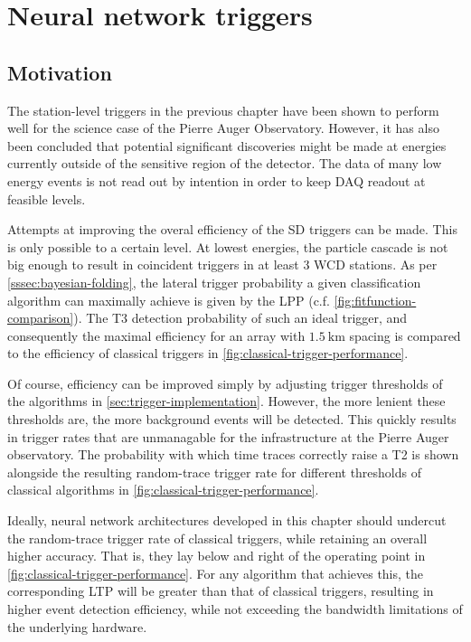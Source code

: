 
\chapter{Neural network triggers}
\label{chap:neural-network-triggers}

\section{Motivation}
\label{sec:motivation}

The station-level triggers in the previous chapter have been shown to perform well for the science case of the Pierre Auger Observatory. However, it has also been
concluded that potential significant discoveries might be made at energies currently outside of the sensitive region of the detector. The data of many low energy 
events is not read out by intention in order to keep DAQ readout at feasible levels.

Attempts at improving the overal efficiency of the SD triggers can be made. This is only possible to a certain level. At lowest energies, the particle cascade is 
not big enough to result in coincident triggers in at least 3 WCD stations. As per \autoref{sssec:bayesian-folding}, the lateral trigger probability a given 
classification algorithm can maximally achieve is given by the LPP (c.f. \autoref{fig:fitfunction-comparison}). The T3 detection probability of such an ideal 
trigger, and consequently the maximal efficiency for an array with $\SI{1.5}{\kilo\meter}$ spacing is compared to the efficiency of classical triggers in 
\autoref{fig:classical-trigger-performance}.

Of course, efficiency can be improved simply by adjusting trigger thresholds of the algorithms in \autoref{sec:trigger-implementation}. However, the more lenient
these thresholds are, the more background events will be detected. This quickly results in trigger rates that are unmanagable for the infrastructure at the Pierre 
Auger observatory. The probability with which time traces correctly raise a T2 is shown alongside the resulting random-trace trigger rate for different thresholds
of classical algorithms in \autoref{fig:classical-trigger-performance}.

Ideally, neural network architectures developed in this chapter should undercut the random-trace trigger rate of classical triggers, while retaining an overall 
higher accuracy. That is, they lay below and right of the operating point in \autoref{fig:classical-trigger-performance}. For any algorithm that achieves this, the 
corresponding LTP will be greater than that of classical triggers, resulting in higher event detection efficiency, while not exceeding the bandwidth limitations 
of the underlying hardware. 

